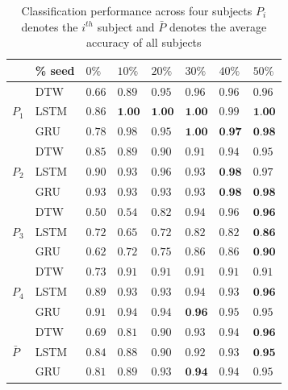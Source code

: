 \documentclass[10pt,twocolumn,letterpaper]{article}
\begin{document}
\begin{table}[h]
	\begin{center}
		\begin{tabular}{|m{1em} | m{3em} | m{1.5em} | m{1.5em} | m{1.5em} |m{1.5em} |m{1.5em} |m{1.5em} |}
			\hline
			& \% seed & $0\%$ & $10\%$ & $20\%$ & $30\%$ & $40\%$ & $50\%$\\
			\hline
			\multirow{3}{3.5em}{$P_1$}
			& DTW & $0.66$ & $0.89$ & $0.95$ & $0.96$ & $0.96$ & $0.96$\\
			\cline{2-8}
			& LSTM & $0.86$ & $\textbf{1.00}$ & $\textbf{1.00}$ & $\textbf{1.00}$ & $0.99$ & $\textbf{1.00}$\\
			\cline{2-8}
			& GRU & $0.78$ & $0.98$ & $0.95$ & $\textbf{1.00}$ & $\textbf{0.97}$ & $\textbf{0.98}$\\
			\hline
			\multirow{3}{3.5em}{$P_2$}
			& DTW & $0.85$ & $0.89$ & $0.90$ & $0.91$ & $0.94$ & $0.95$\\
			\cline{2-8}
			& LSTM & $0.90$ & $0.93$ & $0.96$ & $0.93$ & $\textbf{0.98}$ & $0.97$\\
			\cline{2-8}
			& GRU & $0.93$ & $0.93$ & $0.93$ & $0.93$ & $\textbf{0.98}$ & $\textbf{0.98}$\\
			\hline
			\multirow{3}{3.5em}{$P_3$}
			& DTW & $0.50$ & $0.54$ & $0.82$ & $0.94$ & $0.96$ & $\textbf{0.96}$\\
			\cline{2-8}
			& LSTM & $0.72$ & $0.65$ & $0.72$ & $0.82$ & $0.82$ & $\textbf{0.86}$\\
			\cline{2-8}
			& GRU & $0.62$ & $0.72$ & $0.75$ & $0.86$ & $0.86$ & $\textbf{0.90}$\\
			\hline
			\multirow{3}{3.5em}{$P_4$}
			& DTW & $0.73$ & $0.91$ & $0.91$ & $0.91$ & $0.91$ & $0.91$\\
			\cline{2-8}
			& LSTM & $0.89$ & $0.93$ & $0.93$ & $0.94$ & $0.93$ & $\textbf{0.96}$\\
			\cline{2-8}
			& GRU & $0.91$ & $0.94$ & $0.94$ & $\textbf{0.96}$ & $0.95$ & $0.95$\\
			\hline
			\multirow{3}{3.5em}{$\bar{P}$}
			& DTW & $0.69$ & $0.81$ & $0.90$ & $0.93$ & $0.94$ & $\textbf{0.96}$\\
			\cline{2-8}
			& LSTM & $0.84$ & $0.88$ & $0.90$ & $0.92$ & $0.93$ & $\textbf{0.95}$\\
			\cline{2-8}
			& GRU & $0.81$ & $0.89$ & $0.93$ & $\textbf{0.94}$ & $0.94$ & $0.95$\\
			\hline
		\end{tabular}
	\end{center}
	\caption{Classification performance across four subjects  $P_i$ denotes the $i^{th}$ subject and $\bar{P}$ denotes the average accuracy of all subjects}
	\label{table:result_table}
\end{table}
\end{document}

